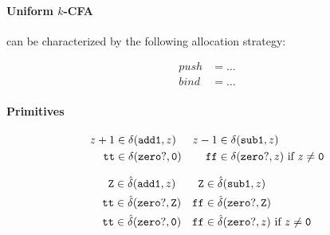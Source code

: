 \documentclass{llncs}
\begin{document}
\paragraph{Uniform \(k\)-CFA} can be characterized by the following allocation
strategy:

\begin{align*}
\mathit{push} &= \dots\\
\mathit{bind} &= \dots
\end{align*}

\paragraph{Primitives}





\begin{align*}
z+1 &\in \delta({\tt add1},z) &
z-1 &\in \delta({\tt sub1},z)\\
{\tt tt} &\in \delta({\tt zero?},{\tt 0}) &
{\tt ff} &\in \delta({\tt zero?},z)\text{ if }z\neq {\tt 0}\\
\end{align*}

\begin{align*}
{\tt Z} &\in \hat\delta({\tt add1},z) &
{\tt Z} &\in \hat\delta({\tt sub1},z)\\
{\tt tt} &\in \hat\delta({\tt zero?},{\tt Z}) &
{\tt ff} &\in \hat\delta({\tt zero?},{\tt Z})\\
{\tt tt} &\in \hat\delta({\tt zero?},{\tt 0}) &
{\tt ff} &\in \hat\delta({\tt zero?},z)\text{ if }z\neq {\tt 0}\\
\end{align*}
\end{document}
